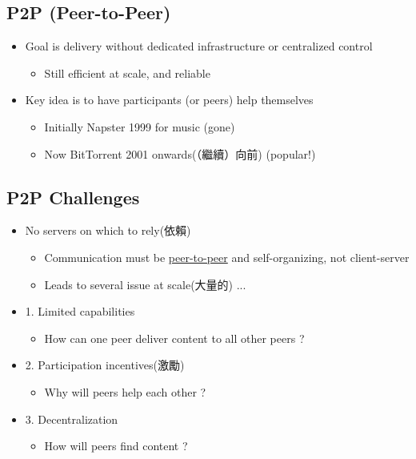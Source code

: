 \documentclass[12pt]{ctexart}   %
\begin{document}
	\subsection{P2P (Peer-to-Peer)}
	\begin{itemize}
		\item Goal is delivery without dedicated infrastructure or centralized control
		\begin{itemize}
			\item Still efficient at scale, and reliable
		\end{itemize}
		
		\item Key idea is to have participants (or peers) help themselves
		\begin{itemize}
			\item Initially Napster 1999 for music (gone)
			\item Now BitTorrent 2001 onwards(（繼續）向前) (popular!)
		\end{itemize}
	\end{itemize}
	
	\subsection{P2P Challenges}
	\begin{itemize}
		\item No servers on which to rely(依賴)
		\begin{itemize}
			\item Communication must be \underline{peer-to-peer} and self-organizing, not client-server
			\item Leads to several issue at scale(大量的) ...
		\end{itemize}
		
		\item {\color{blue} 1.} Limited capabilities
		\begin{itemize}
			\item How can one peer deliver content to all other peers ?
		\end{itemize}
		\item {\color{blue} 2.}  Participation incentives(激勵)
		\begin{itemize}
			\item Why will peers help each other ?
		\end{itemize}
		
		\item {\color{blue} 3.} Decentralization
		\begin{itemize}
			\item How will peers find content ?
		\end{itemize}		 
	\end{itemize}
	
\end{document}
